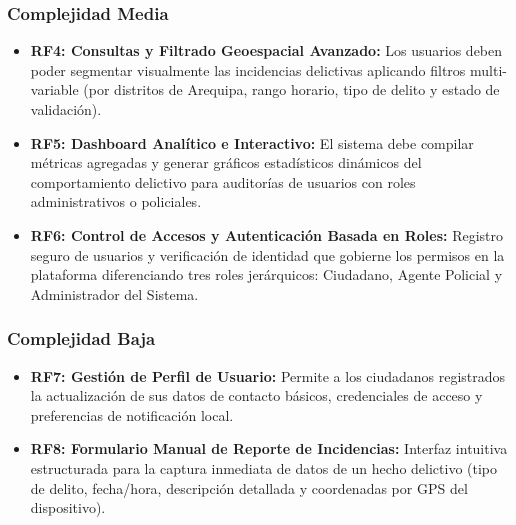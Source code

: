 \documentclass[conference]{IEEEtran}
\begin{document}
\subsubsection{\textbf{Complejidad Media}}
\begin{itemize}
    \item \textbf{RF4: Consultas y Filtrado Geoespacial Avanzado:} Los usuarios deben poder segmentar visualmente las incidencias delictivas aplicando filtros multi-variable (por distritos de Arequipa, rango horario, tipo de delito y estado de validación).
    \item \textbf{RF5: Dashboard Analítico e Interactivo:} El sistema debe compilar métricas agregadas y generar gráficos estadísticos dinámicos del comportamiento delictivo para auditorías de usuarios con roles administrativos o policiales.
    \item \textbf{RF6: Control de Accesos y Autenticación Basada en Roles:} Registro seguro de usuarios y verificación de identidad que gobierne los permisos en la plataforma diferenciando tres roles jerárquicos: Ciudadano, Agente Policial y Administrador del Sistema.
\end{itemize}

\subsubsection{\textbf{Complejidad Baja}}
\begin{itemize}
    \item \textbf{RF7: Gestión de Perfil de Usuario:} Permite a los ciudadanos registrados la actualización de sus datos de contacto básicos, credenciales de acceso y preferencias de notificación local.
    \item \textbf{RF8: Formulario Manual de Reporte de Incidencias:} Interfaz intuitiva estructurada para la captura inmediata de datos de un hecho delictivo (tipo de delito, fecha/hora, descripción detallada y coordenadas por GPS del dispositivo).
\end{itemize}
\end{document}
